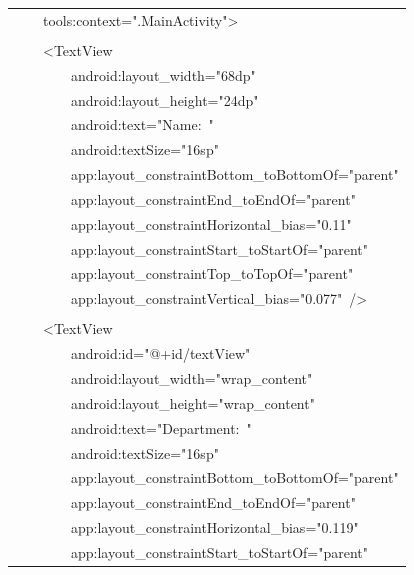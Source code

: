 \documentclass[a4paper,12pt]{article}
\begin{document}
\begin{longtable}{|p{}|}
{\ttfamily\small \ \ \ \ tools:context=".MainActivity"\textgreater{}} \\
\strut \\
{\ttfamily\small \ \ \ \ \textless{}TextView} \\
{\ttfamily\small \ \ \ \ \ \ \ \ android:layout\_width="68dp"} \\
{\ttfamily\small \ \ \ \ \ \ \ \ android:layout\_height="24dp"} \\
{\ttfamily\small \ \ \ \ \ \ \ \ android:text="Name:\ "} \\
{\ttfamily\small \ \ \ \ \ \ \ \ android:textSize="16sp"} \\
{\ttfamily\small \ \ \ \ \ \ \ \ app:layout\_constraintBottom\_toBottomOf="parent"} \\
{\ttfamily\small \ \ \ \ \ \ \ \ app:layout\_constraintEnd\_toEndOf="parent"} \\
{\ttfamily\small \ \ \ \ \ \ \ \ app:layout\_constraintHorizontal\_bias="0.11"} \\
{\ttfamily\small \ \ \ \ \ \ \ \ app:layout\_constraintStart\_toStartOf="parent"} \\
{\ttfamily\small \ \ \ \ \ \ \ \ app:layout\_constraintTop\_toTopOf="parent"} \\
{\ttfamily\small \ \ \ \ \ \ \ \ app:layout\_constraintVertical\_bias="0.077"\ /\textgreater{}} \\
\strut \\
{\ttfamily\small \ \ \ \ \textless{}TextView} \\
{\ttfamily\small \ \ \ \ \ \ \ \ android:id="@+id/textView"} \\
{\ttfamily\small \ \ \ \ \ \ \ \ android:layout\_width="wrap\_content"} \\
{\ttfamily\small \ \ \ \ \ \ \ \ android:layout\_height="wrap\_content"} \\
{\ttfamily\small \ \ \ \ \ \ \ \ android:text="Department:\ "} \\
{\ttfamily\small \ \ \ \ \ \ \ \ android:textSize="16sp"} \\
{\ttfamily\small \ \ \ \ \ \ \ \ app:layout\_constraintBottom\_toBottomOf="parent"} \\
{\ttfamily\small \ \ \ \ \ \ \ \ app:layout\_constraintEnd\_toEndOf="parent"} \\
{\ttfamily\small \ \ \ \ \ \ \ \ app:layout\_constraintHorizontal\_bias="0.119"} \\
{\ttfamily\small \ \ \ \ \ \ \ \ app:layout\_constraintStart\_toStartOf="parent"} \\

\end{longtable}
\end{document}
